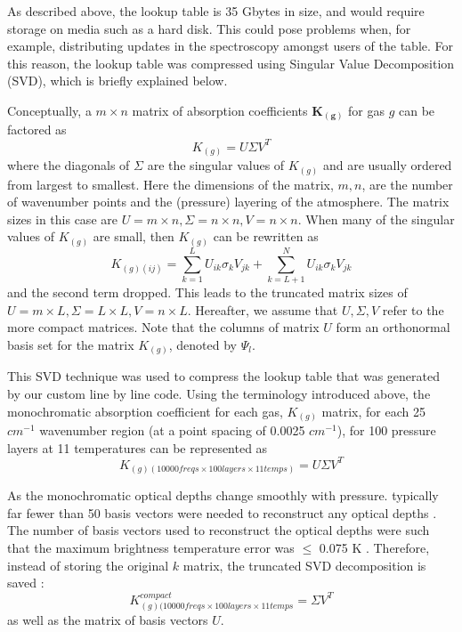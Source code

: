 \documentclass[11pt]{article}
\begin{document}
As described above, the lookup table is 35 Gbytes in size, and would require
storage on media such as a hard disk. This could pose problems when,
for example, distributing updates in the spectroscopy amongst users of
the table.  For this reason, the lookup table was compressed using
Singular Value Decomposition (SVD), which is briefly explained below.

Conceptually, a $m \times n$ matrix of absorption coefficients 
$\mathbf{K_{(g)}}$ for gas $g$ can be factored as
\begin{equation}
K_{(g)} = U \Sigma V^{T}
\end{equation}
where the diagonals of $\Sigma$ are the singular values of $K_{(g)}$
and are usually ordered from largest to smallest. Here the dimensions
of the matrix, $m,n$, are the number of wavenumber points and the
(pressure) layering of the atmosphere. The matrix sizes in this case
are $U = m \times n, \Sigma = n \times n, V = n \times n$. When many
of the singular values of $K_{(g)}$ are small, then $K_{(g)}$ can be
rewritten as
\begin{equation}
K_{(g)(ij)} = \sum_{k=1}^{L} U_{ik} \sigma_{k} V_{jk} + 
         \sum_{k=L+1}^{N} U_{ik} \sigma_{k} V_{jk}
\end{equation}
and the second term dropped. This leads to the truncated matrix sizes
of $U = m \times L, \Sigma = L \times L, V = n \times L$. Hereafter,
we assume that $U,\Sigma,V$ refer to the more compact matrices.  Note
that the columns of matrix $U$ form an orthonormal basis set for the
matrix $K_{(g)}$, denoted by $\Psi_{l}$.

This SVD technique was used to compress the lookup table that was generated by
our custom line by line code. Using the terminology introduced above, the
monochromatic absorption coefficient for each gas, $K_{(g)}$ matrix,
for each 25 $cm^{-1}$ wavenumber region (at a point spacing of 0.0025
$cm^{-1}$), for 100 pressure layers at 11 temperatures can be
represented as
\begin{equation}
K_{(g)(10000 freqs \times 100 layers \times 11 temps)} = U \Sigma V^{T}
\end{equation}

As the monochromatic optical depths change smoothly with pressure.
typically far fewer than 50 basis vectors were needed to reconstruct
any optical depths \cite{str:97}. The number of basis vectors used to
reconstruct the optical depths were such that the maximum brightness
temperature error was $\le$ 0.075 K \cite{str:97}. Therefore, instead
of storing the original $k$ matrix, the truncated SVD decomposition is
saved :
\begin{equation}
K^{compact}_{(g)(10000 freqs \times 100 layers \times 11 temps} = 
\Sigma V^{T}
\end{equation}  
as well as the matrix of basis vectors $U$. 
\end{document}
